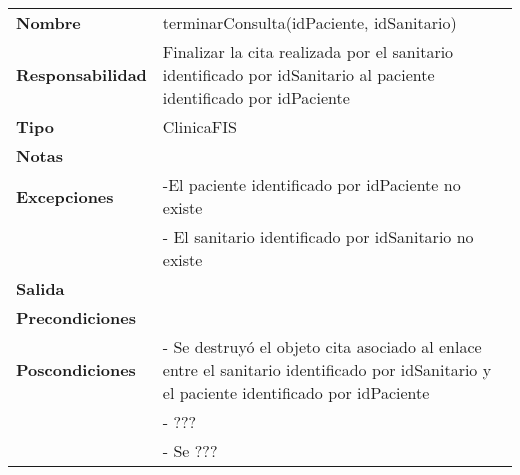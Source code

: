 \documentclass[11pt,a4paper]{article}
\begin{document}
\begin{table}[H]
\centering
\label{my-label}
\begin{tabular}{l|l}
\textbf{Nombre}          & terminarConsulta(idPaciente, idSanitario) \\
\textbf{Responsabilidad} & Finalizar la cita realizada por el sanitario identificado por idSanitario al paciente identificado por idPaciente\\
\textbf{Tipo}            & ClinicaFIS \\
\textbf{Notas}           &  \\
\textbf{Excepciones}     & -El paciente identificado por idPaciente no existe\\
& - El sanitario identificado por idSanitario no existe \\
\textbf{Salida}          &  \\
\textbf{Precondiciones}  &  \\
\textbf{Poscondiciones}  & - Se destruyó el objeto cita asociado al enlace entre el sanitario identificado por idSanitario y el paciente identificado por idPaciente\\
 & - ???\\
 & - Se ???\\
\end{tabular}
\end{table}
\end{document}
